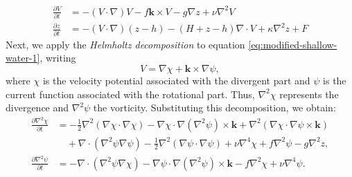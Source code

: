 \begin{align}
    \frac{\partial V}{\partial t} & = - ( V \cdot \nabla)V - f \mathbf{k} \times V - g \nabla z + \nu \nabla^2 V \label{eq:modified-shallow-water-1}     \\
    
\frac{\partial z}{\partial t} & = - (V \cdot \nabla)(z - h) - (H + z - h)\nabla \cdot  V + \kappa \nabla^2 z + F \label{eq:modified-shallow-water-2} 
\end{align}
Next, we apply the \textit{Helmholtz decomposition} to equation \eqref{eq:modified-shallow-water-1}, writing
\begin{equation*}
    V = \nabla \chi + \mathbf{k} \times \nabla \psi,
\end{equation*}
where $\chi$ is the velocity potential associated with the divergent part and $\psi$ is the current function associated with the rotational part. Thus, $\nabla^2 \chi$ represents the divergence and $\nabla^2 \psi$ the vorticity. Substituting this decomposition, we obtain:
\begin{align}
\frac{\partial \nabla^2 \chi}{\partial t} & = -\tfrac{1}{2}\nabla^2(\nabla \chi \cdot \nabla \chi)     
- \nabla \chi \cdot \nabla(\nabla^2\psi) \times \mathbf{k} 
    + \nabla^2(\nabla \chi \cdot \nabla \psi \times \mathbf{k}) \nonumber \\
    & \quad + \nabla \cdot (\nabla^2\psi\nabla\psi)
              
- \tfrac{1}{2}\nabla^2(\nabla \psi \cdot \nabla \psi) 
    + \nu\nabla^4\chi + f\nabla^2\psi - g\nabla^2z, \label{eq:equacao-basica-1} \\
    
\frac{\partial \nabla^2 \psi}{\partial t} & = -\nabla \cdot (\nabla^2\psi\nabla \chi)              
    - \nabla \psi \cdot \nabla(\nabla^2\psi) \times \mathbf{k}
 
- f\nabla^2\chi + \nu\nabla^4\psi. \label{eq:basic-equation-2}
\end{align}
